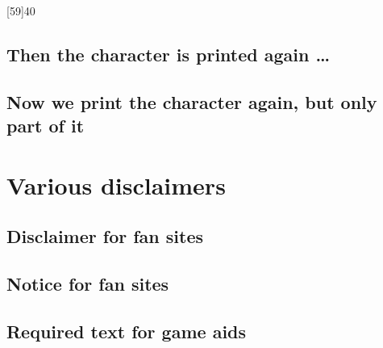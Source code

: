 \documentclass{article}
\begin{document}
\begin{character}
  [59]{40}
\end{character}

\subsection{Then the character is printed again \ldots{}}
\label{sec:then-char-prepr}


\subsection{Now we print the character again, but only part of it}
\label{sec:aasdfasdf}

\makeatletter
{}
\ResetCharacterKey
\makeatother


\section{Various disclaimers}
\label{sec:various-disclaimers}

\subsection{Disclaimer for fan sites}
\label{sec:disclaimer-fan-sites}

\SJGamesOnlinePolicyDisclaimer

\subsection{Notice for fan sites}
\label{sec:disclaimer-fan-sites}

\SJGamesOnlinePolicyNotice

\subsection{Required text for game aids}
\label{sec:disclaimer-fan-sites}

\end{document}
